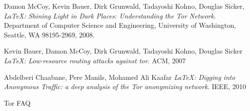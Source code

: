 \documentclass[journal]{IEEEtran}
\begin{document}
\begin{thebibliography}{9}

  Damon McCoy, Kevin Bauer, Dirk Grunwald, Tadayoshi Kohno, Douglas Sicker,
  \emph{\LaTeX: Shining Light in Dark Places: Understanding the Tor Network}.
  Department of Computer Science and Engineering,
  University of Washington, Seattle, WA 98195-2969,
  2008.

  Kevin Bauer, Damon McCoy, Dirk Grunwald, Tadayoshi Kohno, Douglas Sicker
  \emph{\LaTeX: Low-resource routing attacks against tor}.
  ACM, 2007

  Abdelberi Chaabane, Pere Manils, Mohamed Ali Kaafar
  \emph{\LaTeX: Digging into Anonymous Trafﬁc: a deep analysis of the Tor anonymizing network}.
  IEEE, 2010

  Tor FAQ

\end{thebibliography}
\end{document}
